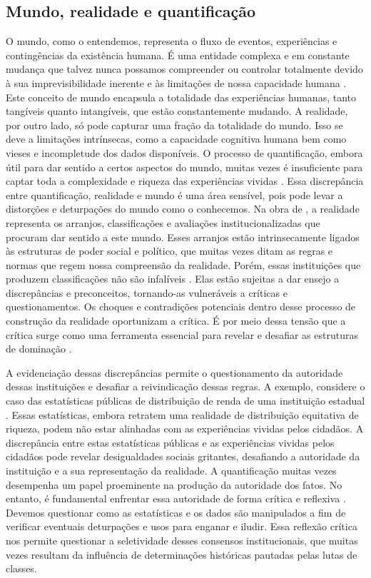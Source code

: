 \subsection{Mundo, realidade e quantificação}

O mundo, como o entendemos, representa o fluxo de eventos, experiências e contingências da existência humana. É uma entidade complexa e em constante mudança que talvez nunca possamos compreender ou controlar totalmente devido à sua imprevisibilidade inerente e às limitações de nossa capacidade humana \cite{mottaresisting}. Este conceito de mundo encapsula a totalidade das experiências humanas, tanto tangíveis quanto intangíveis, que estão constantemente mudando. A realidade, por outro lado, só pode capturar uma fração da totalidade do mundo. Isso se deve a limitações intrínsecas, como a capacidade cognitiva humana bem como vieses e incompletude dos dados disponíveis. O processo de quantificação, embora útil para dar sentido a certos aspectos do mundo, muitas vezes é insuficiente para captar toda a complexidade e riqueza das experiências vividas \cite{hirata2021operaccoes}. Essa discrepância entre quantificação, realidade e mundo é uma área sensível, pois pode levar a distorções e deturpações do mundo como o conhecemos. Na obra de , a realidade representa os arranjos, classificações e avaliações institucionalizadas que procuram dar sentido a este mundo. Esses arranjos estão intrinsecamente ligados às estruturas de poder social e político, que muitas vezes ditam as regras e normas que regem nossa compreensão da realidade. Porém, essas instituições que produzem classificações não são infalíveis \cite{camargo2022estado}. Elas estão sujeitas a dar ensejo a discrepâncias e preconceitos, tornando-as vulneráveis a críticas e questionamentos. Os choques e contradições potenciais dentro desse processo de construção da realidade oportunizam a crítica. É por meio dessa tensão que a crítica surge como uma ferramenta essencial para revelar e desafiar as estruturas de dominação \cite{boltanski2011critique}.

A evidenciação dessas discrepâncias permite o questionamento da autoridade dessas instituições e desafiar a reivindicação dessas regras. A exemplo, considere o caso das estatísticas públicas de distribuição de renda de uma instituição estadual \cite{susen2014spirit}. Essas estatísticas, embora retratem uma realidade de distribuição equitativa de riqueza, podem não estar alinhadas com as experiências vividas pelos cidadãos. A discrepância entre estas estatísticas públicas e as experiências vividas pelos cidadãos pode revelar desigualdades sociais gritantes, desafiando a autoridade da instituição e a sua representação da realidade. A quantificação muitas vezes desempenha um papel proeminente na produção da autoridade dos fatos. No entanto, é fundamental enfrentar essa autoridade de forma crítica e reflexiva \cite{boltanski2011critique}. Devemos questionar como as estatísticas e os dados são manipulados a fim de verificar eventuais deturpações e usos para enganar e iludir. Essa reflexão crítica nos permite questionar a seletividade desses consensos institucionais, que muitas vezes resultam da influência de determinações históricas pautadas pelas lutas de classes.

